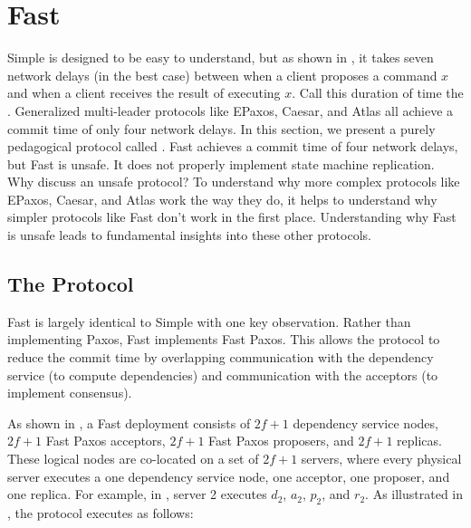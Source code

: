 \section{Fast \BPaxos{}}
Simple \BPaxos{} is designed to be easy to understand, but as shown in
, it takes seven network delays (in the best case)
between when a client proposes a command $x$ and when a client receives the
result of executing $x$. Call this duration of time the .
Generalized multi-leader protocols like EPaxos, Caesar, and Atlas all achieve a
commit time of only four network delays.
%
In this section, we present a purely pedagogical protocol called . Fast \BPaxos{} achieves a commit time of four network delays, but
Fast \BPaxos{} is unsafe. It does not properly implement state machine
replication. Why discuss an unsafe protocol? To understand why more complex
protocols like EPaxos, Caesar, and Atlas work the way they do, it helps to
understand why simpler protocols like Fast \BPaxos{} don't work in the first
place. Understanding why Fast \BPaxos{} is unsafe leads to fundamental insights
into these other protocols.

\subsection{The Protocol}
{}

Fast \BPaxos{} is largely identical to Simple \BPaxos{} with one key
observation. Rather than implementing Paxos, Fast \BPaxos{} implements Fast
Paxos. This allows the protocol to reduce the commit time by overlapping
communication with the dependency service (to compute dependencies) and
communication with the acceptors (to implement consensus).

As shown in , a Fast \BPaxos{} deployment consists of $2f+1$
dependency service nodes, $2f+1$ Fast Paxos acceptors, $2f+1$ Fast Paxos
proposers, and $2f+1$ replicas. These logical nodes are co-located on a set of
$2f+1$ servers, where every physical server executes a one dependency service
node, one acceptor, one proposer, and one replica. For example, in
, server 2 executes $d_2$, $a_2$, $p_2$, and $r_2$. As
illustrated in , the protocol executes as follows:

